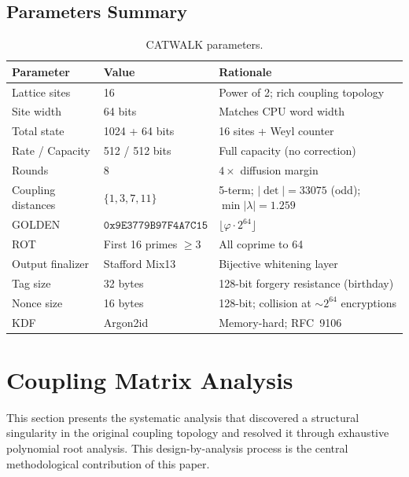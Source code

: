 \documentclass[runningheads]{llncs}
\newcommand{\GOLDEN}{\texttt{0x9E3779B97F4A7C15}}
\begin{document}
\subsection{Parameters Summary}

\begin{table}[h]
\centering
\caption{CATWALK parameters.}
\label{tab:params}
\begin{tabular}{@{}lll@{}}
\toprule
Parameter & Value & Rationale \\
\midrule
Lattice sites & 16 & Power of 2; rich coupling topology \\
Site width & 64 bits & Matches CPU word width \\
Total state & 1024 + 64 bits & 16 sites + Weyl counter \\
Rate / Capacity & 512 / 512 bits & Full capacity (no correction) \\
Rounds & 8 & $4\times$ diffusion margin \\
Coupling distances & $\{1,3,7,11\}$ & 5-term; $|\det|=33075$ (odd); $\min|\lambda|=1.259$ \\
GOLDEN & $\GOLDEN$ & $\lfloor \varphi \cdot 2^{64} \rfloor$ \\
ROT & First 16 primes $\geq 3$ & All coprime to 64 \\
Output finalizer & Stafford Mix13 & Bijective whitening layer \\
Tag size & 32 bytes & 128-bit forgery resistance (birthday) \\
Nonce size & 16 bytes & 128-bit; collision at $\sim\!2^{64}$ encryptions \\
KDF & Argon2id & Memory-hard; RFC~9106 \\
\bottomrule
\end{tabular}
\end{table}

\section{Coupling Matrix Analysis}
\label{sec:coupling}

This section presents the systematic analysis that discovered a structural
singularity in the original coupling topology and resolved it through
exhaustive polynomial root analysis.  This design-by-analysis process is the
central methodological contribution of this paper.
\end{document}
